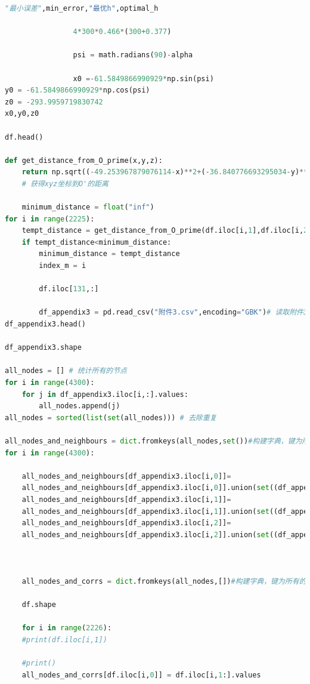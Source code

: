 \documentclass[withoutpreface,bwprint]{cumcmthesis} %
\begin{document}
\begin{appendices}
\begin{lstlisting}[language=python]
                "最小误差",min_error,"最优h",optimal_h

                4*300*0.466*(300+0.377)

                psi = math.radians(90)-alpha

                x0 =-61.5849866990929*np.sin(psi)
y0 = -61.5849866990929*np.cos(psi)
z0 = -293.9959719830742
x0,y0,z0

df.head()

def get_distance_from_O_prime(x,y,z):
    return np.sqrt((-49.253967879076114-x)**2+(-36.840776693295034-y)**2+(-293.6269807439393-z)**2) 
    # 获得xyz坐标到O'的距离

    minimum_distance = float("inf")
for i in range(2225):
    tempt_distance = get_distance_from_O_prime(df.iloc[i,1],df.iloc[i,2],df.iloc[i,3])
    if tempt_distance<minimum_distance:
        minimum_distance = tempt_distance
        index_m = i

        df.iloc[131,:]

        df_appendix3 = pd.read_csv("附件3.csv",encoding="GBK")# 读取附件3的数据
df_appendix3.head()

df_appendix3.shape

all_nodes = [] # 统计所有的节点
for i in range(4300):
    for j in df_appendix3.iloc[i,:].values:
        all_nodes.append(j)
all_nodes = sorted(list(set(all_nodes))) # 去除重复

all_nodes_and_neighbours = dict.fromkeys(all_nodes,set())#构建字典，键为所有的节点编号，值为其对应的临近节点
for i in range(4300):
    
    all_nodes_and_neighbours[df_appendix3.iloc[i,0]]=
    all_nodes_and_neighbours[df_appendix3.iloc[i,0]].union(set((df_appendix3.iloc[i,1],df_appendix3.iloc[i,2]))) # 给每个节点都
    all_nodes_and_neighbours[df_appendix3.iloc[i,1]]=
    all_nodes_and_neighbours[df_appendix3.iloc[i,1]].union(set((df_appendix3.iloc[i,0],df_appendix3.iloc[i,2])))  #添加临近节点
    all_nodes_and_neighbours[df_appendix3.iloc[i,2]]=
    all_nodes_and_neighbours[df_appendix3.iloc[i,2]].union(set((df_appendix3.iloc[i,1],df_appendix3.iloc[i,0])))



    all_nodes_and_corrs = dict.fromkeys(all_nodes,[])#构建字典，键为所有的节点编号，值为其对应的其坐标

    df.shape

    for i in range(2226):
    #print(df.iloc[i,1])

    #print()
    all_nodes_and_corrs[df.iloc[i,0]] = df.iloc[i,1:].values


\end{lstlisting}
\end{appendices}
\end{document}
